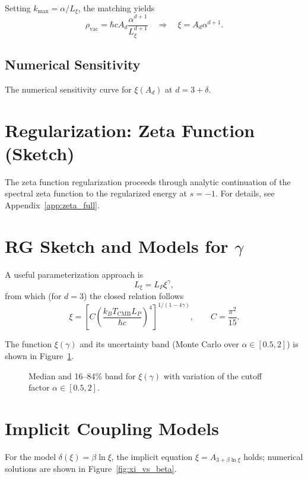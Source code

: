 	Setting $k_{\max}=\alpha/L_\xi$, the matching yields
	\begin{equation}
		\rho_{\mathrm{vac}} = \hbar c  A_d  \frac{\alpha^{d+1}}{L_\xi^{d+1}}
		\quad\Rightarrow\quad
		\xi = A_d \alpha^{d+1}.
	\end{equation}
	
	\subsection{Numerical Sensitivity}
	The numerical sensitivity curve for $\xi(A_d)$ at $d=3+\delta$.
	
	\section{Regularization: Zeta Function (Sketch)}
	The zeta function regularization proceeds through analytic continuation of the spectral zeta function to the regularized energy at $s=-1$. For details, see Appendix~\ref{app:zeta_full}.
	
	\section{RG Sketch and Models for $\gamma$}
	A useful parameterization approach is
	\begin{equation}
		L_\xi = L_P\xi^{\gamma},
	\end{equation}
	from which (for $d=3$) the closed relation follows
	\begin{equation}
		\xi = \left[ C \left(\frac{k_B T_{\mathrm{CMB}} L_P}{\hbar c}\right)^4 \right]^{1/(1-4\gamma)},\qquad C=\frac{\pi^2}{15}.
	\end{equation}
	
	The function $\xi(\gamma)$ and its uncertainty band (Monte Carlo over $\alpha\in[0.5,2]$) is shown in Figure~\ref{fig:xi_gamma_mc}.
	
	\begin{figure}[htbp]
		\centering

		\caption{Median and 16--84\% band for $\xi(\gamma)$ with variation of the cutoff factor $\alpha\in[0.5,2]$.}
		\label{fig:xi_gamma_mc}
	\end{figure}
	
	\section{Implicit Coupling Models}
	For the model $\delta(\xi)=\beta\ln\xi$, the implicit equation $\xi=A_{3+\beta\ln\xi}$ holds; numerical solutions are shown in Figure~\ref{fig:xi_vs_beta}.
	
